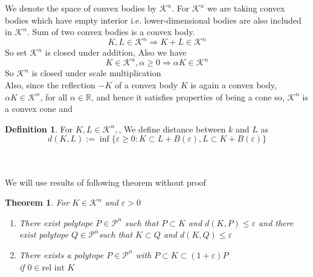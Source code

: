 \documentclass[oneside]{book}
\newtheorem{theorem}{Theorem}[section]
\theoremstyle{definition}
\newtheorem{mydef}{Definition}[chapter]
\begin{document}
 
 We denote  the space of convex bodies by  $\mathcal{K}^{n}$. For  $\mathcal{K}^{n}$  we are taking convex bodies which have empty interior i.e. lower-dimensional bodies are also included in $\mathcal{K}^{n}$. 
 Sum of two convex bodies is a convex body. \\
 $$
   K, L \in \mathcal{K}^{n} \Longrightarrow K+L \in \mathcal{K}^{n}
$$ 
 So  set $\mathcal{K}^{n}$ is closed under addition,
 Also we have
 $$ 
K \in \mathcal{K}^{n}, \alpha \geq 0 \Longrightarrow \alpha K \in \mathcal{K}^{n}
$$
So  $\mathcal{K}^{n}$ is closed under scale multiplication \\
Also, since the reflection $-K$ of a convex body $K$ is again a convex body, $\alpha K \in \mathcal{K}^{n}$, for all $\alpha \in \mathbb{R}$, and hence it satisfies properties of being a cone so,  $\mathcal{K}^{n}$ is a convex cone and 
\begin{mydef}	
For  $ K, L \in \mathcal{K}^{n}, $, We define distance between $k$ and $L$ as 
\begin{equation}
\label{eq42}
d(K, L):=\inf \{\varepsilon \geq 0: K \subset L+B(\varepsilon), L \subset K+B(\varepsilon)\}
\end{equation}
\end{mydef}
\quad 
\\\\
We will use results of following theorem without proof 
\begin{theorem}
\label{t:8}
For  $K \in \mathcal{K}^{n}$ and $\varepsilon>0$ \\
\begin{enumerate}
\item
There exist  polytope $ P  \in \mathcal{P}^{n}$ such that  $P \subset K$ and  $d(K, P) \leq \varepsilon$ \newline 
and \newline
  there exist polytope $Q \in \mathcal{P}^{n}$such that  $K \subset Q$ and $d(K, Q) \leq \varepsilon$ 
\item 
  There exists a polytope $P \in \mathcal{P}^{n}$ with $P \subset K \subset(1+\varepsilon) P$ \\
  if $0 \in \text{rel int } K $ \label{4.1.5}
\end{enumerate}
\end{theorem}
\end{document}
